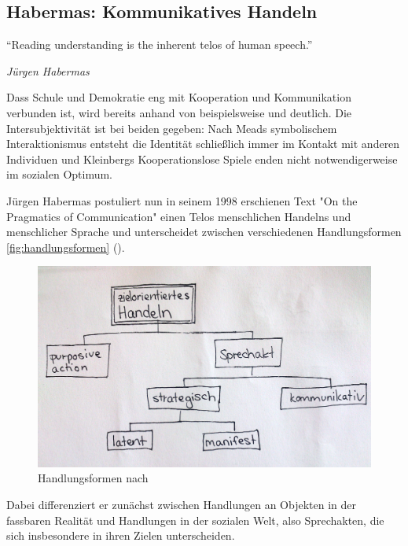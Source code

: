 \subsection{Habermas: Kommunikatives Handeln}

\epigraph{
		``Reading understanding is the inherent telos of human speech.''}
	{
		\emph{Jürgen Habermas
	}

Dass Schule und Demokratie eng mit Kooperation und Kommunikation verbunden ist, wird bereits anhand von beispielsweise \citeauthor{Kleinberg-2009-oz} und \citeauthor{mead-1934en} deutlich.
Die Intersubjektivität ist bei beiden gegeben:
Nach Meads symbolischem Interaktionismus entsteht die Identität schließlich immer im Kontakt mit anderen Individuen und Kleinbergs Kooperationslose Spiele enden nicht notwendigerweise im sozialen Optimum.

Jürgen Habermas \citeauthor{Habermas-1998-aa} postuliert nun in seinem 1998 erschienen Text "On the Pragmatics of Communication" einen Telos menschlichen Handelns und menschlicher Sprache und unterscheidet zwischen verschiedenen Handlungsformen \autoref{fig:handlungsformen} ().

\begin{figure}[htbp]
	\begin{center}
	\includegraphics[width=1\textwidth]{img/Habermas_Baumuebersicht.jpg}
	\caption{Handlungsformen nach \cite{Habermas-1998-aa}}
	\label{fig:handlungsformen}
	\end{center}
\end{figure}

Dabei differenziert er zunächst zwischen Handlungen an Objekten in der fassbaren Realität und Handlungen in der sozialen Welt, also Sprechakten, die sich insbesondere in ihren Zielen unterscheiden.

}
